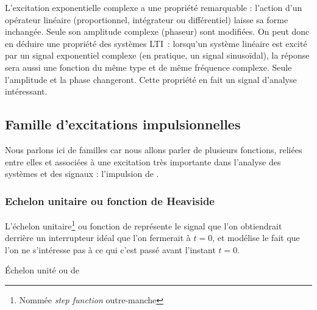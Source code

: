 \begin{remark}{}
	
      L'excitation exponentielle complexe a une propriété remarquable
      : l'action d'un opérateur linéaire (proportionnel, intégrateur
      ou différentiel) laisse sa forme inchangée. Seule son amplitude
      complexe (phaseur) sont modifiées. On peut donc en déduire une
      propriété des systèmes LTI~: lorsqu'un système linéaire est
      excité par un signal exponentiel complexe (en pratique, un
      signal sinusoïdal), la réponse sera aussi une fonction du même
      type et de même fréquence complexe. Seule l'amplitude et la
      phase changeront. Cette propriété en fait un signal d'analyse
      intéressant.
	
      \subsection{Famille d'excitations impulsionnelles}
	
	Nous parlons ici de familles car nous allons parler de
        plusieurs fonctions, reliées entre elles et associées à une
        excitation très importante dans l'analyse des systèmes et des
        signaux : l'impulsion de \Dirac.
	
	\subsubsection{Echelon unitaire ou fonction de Heaviside}

        L'échelon unitaire\footnote{Nommée \emph{step function}
          outre-manche} ou fonction de \Heaviside{} représente le
        signal que l'on obtiendrait derrière un interrupteur idéal que
        l'on fermerait à $t = 0$, et modélise le fait que l'on ne
        s'intéresse pas à ce qui c'est passé avant l'instant $t=0$.
        \begin{definition}{Échelon unité ou de \Heaviside{}}


\end{definition}
\end{remark}
